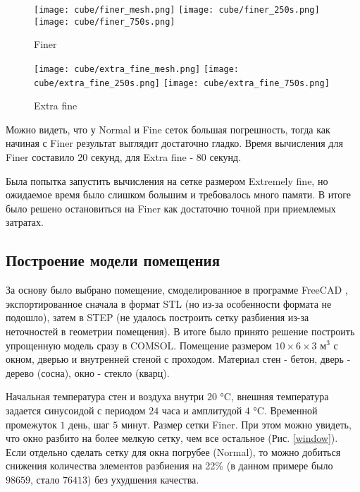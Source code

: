 \begin{figure}[H]
\texttt{[image: cube/finer\_mesh.png]}\hfill
\texttt{[image: cube/finer\_250s.png]}\hfill
\texttt{[image: cube/finer\_750s.png]}\hfill
\caption{Finer}
\label{cube-finer}
\end{figure}

\begin{figure}[H]
\texttt{[image: cube/extra\_fine\_mesh.png]}\hfill
\texttt{[image: cube/extra\_fine\_250s.png]}\hfill
\texttt{[image: cube/extra\_fine\_750s.png]}\hfill
\caption{Extra fine}
\label{cube-extra-fine}
\end{figure}

Можно видеть, что у Normal и Fine сеток большая погрешность, тогда как начиная с Finer результат выглядит достаточно гладко. Время вычисления для Finer составило 20 секунд, для Extra fine - 80 секунд.\par
Была попытка запустить вычисления на сетке размером Extremely fine, но ожидаемое время было слишком большим и требовалось много памяти. В итоге было решено остановиться на Finer как достаточно точной при приемлемых затратах.

\newpage


\subsection{Построение модели помещения}

За основу было выбрано помещение, смоделированное в программе FreeCAD \cite{freecad}, экспортированное сначала в формат STL \cite{stl} (но из-за особенности формата не подошло), затем в STEP \cite{step} (не удалось построить сетку разбиения из-за неточностей в геометрии помещения). В итоге было принято решение построить упрощенную модель сразу в COMSOL. Помещение размером $10 \times 6 \times 3 \text{ м}^3$ с окном, дверью и внутренней стеной с проходом. Материал стен - бетон, дверь - дерево (сосна), окно - стекло (кварц).

Начальная температура стен и воздуха внутри $20$ °C, внешняя температура задается синусоидой с периодом $24$ часа и амплитудой $4$ °C.
Временной промежуток $1$ день, шаг $5$ минут. Размер сетки Finer. При этом можно увидеть, что окно разбито на более мелкую сетку, чем все остальное (Рис. \ref{window}). Если отдельно сделать сетку для окна погрубее (Normal), то можно добиться снижения количества элементов разбиения на 22\% (в данном примере было $98659$, стало $76413$) без ухудшения качества.

